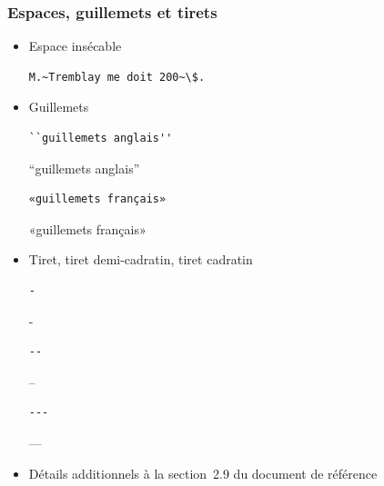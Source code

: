 \begin{frame}[fragile=singleslide]
  \frametitle{Espaces, guillemets et tirets}
  \begin{itemize}
  \item Espace insécable
\begin{lstlisting}
M.~Tremblay me doit 200~\$.
\end{lstlisting}
  \item Guillemets
    \begin{demo}
      \begin{texample}
\begin{lstlisting}[escapeinside={}]
``guillemets anglais''
\end{lstlisting}
        \producing
        ``guillemets anglais''
      \end{texample}
      \begin{texample}
\begin{lstlisting}
«guillemets français»
\end{lstlisting}
        \producing
        «guillemets français»
      \end{texample}
   \end{demo}
  \item Tiret, tiret demi-cadratin, tiret cadratin
    \begin{demo}
      \begin{minipage}{0.15\linewidth}
        \begin{texample}
\begin{lstlisting}
-
\end{lstlisting}
          \producing
          -
        \end{texample}
      \end{minipage}
      \hfill
      \begin{minipage}{0.15\linewidth}
        \begin{texample}
\begin{lstlisting}
--
\end{lstlisting}
          \producing
          --
        \end{texample}
      \end{minipage}
      \hfill
      \begin{minipage}{0.15\linewidth}
        \begin{texample}
\begin{lstlisting}
---
\end{lstlisting}
          \producing
          ---
        \end{texample}
      \end{minipage}
      \hfill
    \end{demo}
  \item Détails additionnels à la section~2.9 du document de référence
  \end{itemize}
\end{frame}


